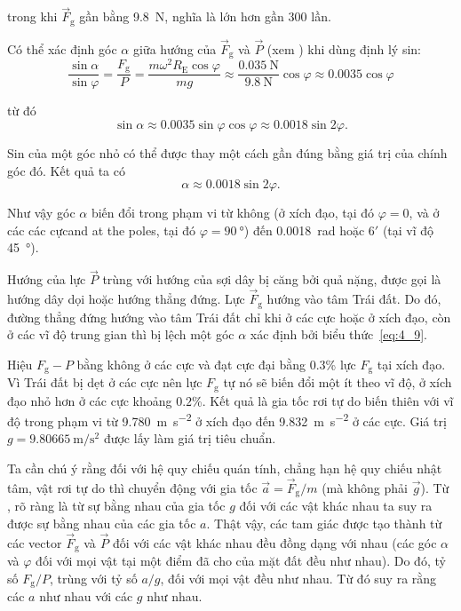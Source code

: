 \noindent
trong khi $\vec{F}_{\text{g}}$ gần bằng \SI{9.8}{\newton}, nghĩa là lớn hơn gần $300$ lần.

Có thể xác định góc $\alpha$ giữa hướng của $\vec{F}_{\text{g}}$ và $\vec{P}$ (xem ) khi dùng định lý sin:
\begin{equation*}
\frac{\sin\alpha}{\sin\varphi} = \frac{F_{\text{g}}}{P} = \frac{m\omega^2 R_{\text{E}}\cos\varphi}{mg} \approx \frac{\SI{0.035}{\newton}}{\SI{9.8}{\newton}} \cos\varphi \approx 0.0035 \cos\varphi
\end{equation*}

\noindent
từ đó
\begin{equation*}
\sin\alpha \approx 0.0035\sin\varphi\cos\varphi \approx 0.0018 \sin 2\varphi.
\end{equation*}

\noindent
Sin của một góc nhỏ có thể được thay một cách gần đúng bằng giá trị của chính góc đó. Kết quả ta có
\begin{equation}\label{eq:4_9}
\alpha \approx 0.0018 \sin 2\varphi.
\end{equation}

\noindent
Như vậy góc $\alpha$ biến đổi trong phạm vi từ không (ở xích đạo, tại đó $\varphi=0$, và ở các các cựcand at the poles, tại đó $\varphi=\SI{90}{\degree}$) đến \SI{0.0018}{\radian} hoặc $6'$ (tại vĩ độ \SI{45}{\degree}).

Hướng của lực $\vec{P}$ trùng với hướng của sợi dây bị căng bởi quả nặng, được gọi là hướng dây dọi hoặc hướng thẳng đứng. Lực $\vec{F}_{\text{g}}$ hướng vào tâm Trái đất. Do đó, đường thẳng đứng hướng vào tâm Trái đất chỉ khi ở các cực hoặc ở xích đạo, còn ở các vĩ độ trung gian thì bị lệch một góc $\alpha$ xác định bởi biểu thức~\eqref{eq:4_9}.

Hiệu $F_{\text{g}}-P$ bằng không ở các cực và đạt cực đại bằng $0.3$\% lực $F_{\text{g}}$ tại xích đạo. Vì Trái đất bị dẹt ở các cực nên lực $F_{\text{g}}$ tự nó sẽ biến đổi một ít theo vĩ độ, ở xích đạo nhỏ hơn ở các cực khoảng $0.2$\%. Kết quả là gia tốc rơi tự do biến thiên với vĩ độ trong phạm vi từ \SI{9.780}{\metre\per\square\second} ở xích đạo đến \SI{9.832}{\metre\per\square\second} ở các cực. Giá trị $g=\SI{9.80665}{\metre\per\square\second}$ được lấy làm giá trị tiêu chuẩn.

Ta cần chú ý rằng đối với hệ quy chiếu quán tính, chẳng hạn hệ quy chiếu nhật tâm, vật rơi tự do thì chuyển động với gia tốc $\vec{a}=\vec{F}_{\text{g}}/m$ (mà không phải $\vec{g}$). Từ , rõ ràng là từ sự bằng nhau của gia tốc $g$ đối với các vật khác nhau ta suy ra được sự bằng nhau của các gia tốc $a$. Thật vậy, các tam giác được tạo thành từ các vector $\vec{F}_{\text{g}}$ và $\vec{P}$ đối với các vật khác nhau đều đồng dạng với nhau (các góc $\alpha$ và $\varphi$ đối với mọi vật tại một điểm đã cho của mặt đất đều như nhau). Do đó, tỷ số $F_{\text{g}}/P$, trùng với tỷ số $a/g$, đối với mọi vật đều như nhau. Từ đó suy ra rằng các $a$ như nhau với các $g$ như nhau.

